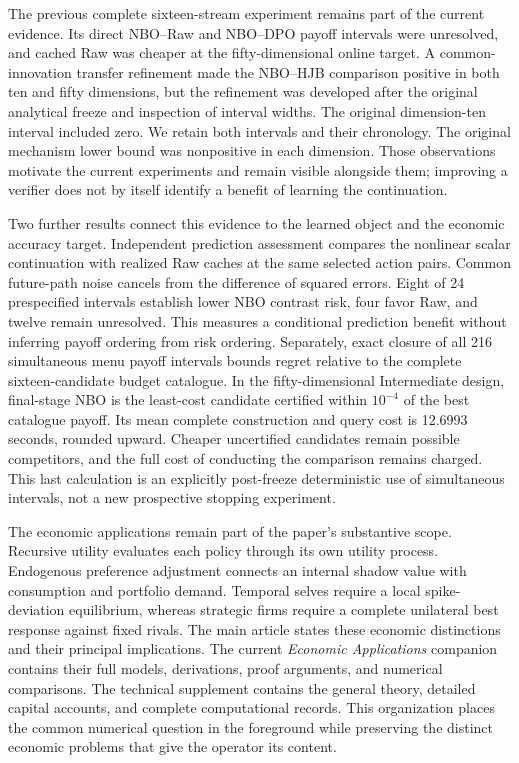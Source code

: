 The previous complete sixteen-stream experiment remains part of the current evidence. Its direct NBO--Raw and NBO--DPO payoff intervals were unresolved, and cached Raw was cheaper at the fifty-dimensional online target. A common-innovation transfer refinement made the NBO--HJB comparison positive in both ten and fifty dimensions, but the refinement was developed after the original analytical freeze and inspection of interval widths. The original dimension-ten interval included zero. We retain both intervals and their chronology. The original mechanism lower bound was nonpositive in each dimension. Those observations motivate the current experiments and remain visible alongside them; improving a verifier does not by itself identify a benefit of learning the continuation.

Two further results connect this evidence to the learned object and the economic accuracy target. Independent prediction assessment compares the nonlinear scalar continuation with realized Raw caches at the same selected action pairs. Common future-path noise cancels from the difference of squared errors. Eight of 24 prespecified intervals establish lower NBO contrast risk, four favor Raw, and twelve remain unresolved. This measures a conditional prediction benefit without inferring payoff ordering from risk ordering. Separately, exact closure of all 216 simultaneous menu payoff intervals bounds regret relative to the complete sixteen-candidate budget catalogue. In the fifty-dimensional Intermediate design, final-stage NBO is the least-cost candidate certified within $10^{-4}$ of the best catalogue payoff. Its mean complete construction and query cost is 12.6993 seconds, rounded upward. Cheaper uncertified candidates remain possible competitors, and the full cost of conducting the comparison remains charged. This last calculation is an explicitly post-freeze deterministic use of simultaneous intervals, not a new prospective stopping experiment.

The economic applications remain part of the paper's substantive scope. Recursive utility evaluates each policy through its own utility process. Endogenous preference adjustment connects an internal shadow value with consumption and portfolio demand. Temporal selves require a local spike-deviation equilibrium, whereas strategic firms require a complete unilateral best response against fixed rivals. The main article states these economic distinctions and their principal implications. The current \emph{Economic Applications} companion contains their full models, derivations, proof arguments, and numerical comparisons. The technical supplement contains the general theory, detailed capital accounts, and complete computational records. This organization places the common numerical question in the foreground while preserving the distinct economic problems that give the operator its content.
